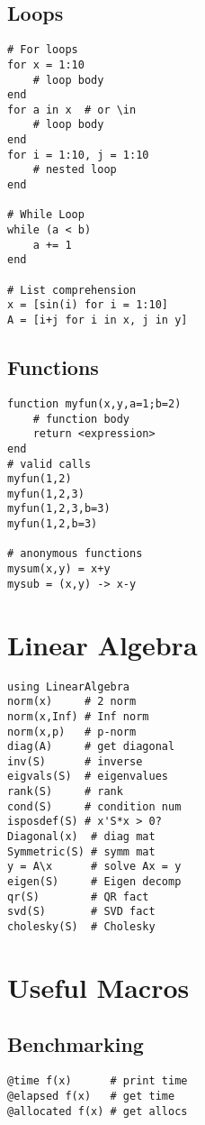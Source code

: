 \documentclass{article}
\begin{document}
\begin{multicols*}{3}
\subsection{Loops}
\vspace*{-2mm}
\begin{verbatim}
# For loops
for x = 1:10
    # loop body
end
for a in x  # or \in
    # loop body
end
for i = 1:10, j = 1:10
    # nested loop
end

# While Loop
while (a < b)
    a += 1
end

# List comprehension
x = [sin(i) for i = 1:10]
A = [i+j for i in x, j in y]
\end{verbatim}

\subsection{Functions}
\vspace*{-2mm}
\begin{verbatim}
function myfun(x,y,a=1;b=2)
    # function body
    return <expression>
end
# valid calls
myfun(1,2)
myfun(1,2,3)
myfun(1,2,3,b=3)
myfun(1,2,b=3)

# anonymous functions
mysum(x,y) = x+y
mysub = (x,y) -> x-y
\end{verbatim}


\section{Linear Algebra}
\vspace*{-2mm}
\begin{verbatim}
using LinearAlgebra
norm(x)     # 2 norm
norm(x,Inf) # Inf norm
norm(x,p)   # p-norm
diag(A)     # get diagonal
inv(S)      # inverse
eigvals(S)  # eigenvalues
rank(S)     # rank
cond(S)     # condition num 
isposdef(S) # x'S*x > 0?
Diagonal(x)  # diag mat
Symmetric(S) # symm mat
y = A\x      # solve Ax = y
eigen(S)     # Eigen decomp 
qr(S)        # QR fact
svd(S)       # SVD fact
cholesky(S)  # Cholesky
\end{verbatim}

\section{Useful Macros}
\subsection{Benchmarking}
\vspace*{-2mm}
\begin{verbatim}
@time f(x)      # print time
@elapsed f(x)   # get time
@allocated f(x) # get allocs


\end{verbatim}
\end{multicols*}
\end{document}
